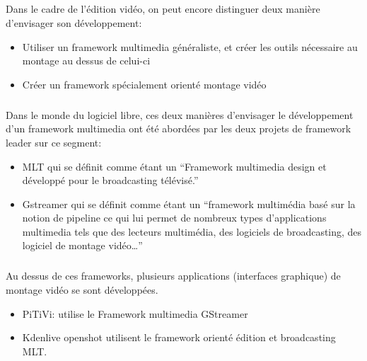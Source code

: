 \subparagraph{}

Dans le cadre de l'édition vidéo, on peut encore distinguer deux
manière d'envisager son développement:

\begin {itemize}

  \item {Utiliser un framework multimedia généraliste, et créer les
  outils nécessaire
         au montage au dessus de celui-ci} %

  \item {Créer un framework spécialement orienté montage vidéo}

\end {itemize}

\subparagraph{}

Dans le monde du logiciel libre, ces deux manières d'envisager le
développement d'un framework multimedia ont été abordées par les
deux projets de framework leader sur ce segment:

\begin {itemize}

  \item {MLT qui se définit comme étant un ``Framework multimedia design
    et développé pour le broadcasting télévisé.''}

  \item {Gstreamer qui se définit comme étant un ``framework multimédia
    basé sur la notion de pipeline ce qui lui permet de nombreux types
    d'applications multimedia tels que des lecteurs multimédia, des
    logiciels de broadcasting, des logiciel de montage vidéo\ldots''}

\end {itemize}

\subparagraph {}

Au dessus de ces frameworks, plusieurs applications (interfaces graphique)
de montage vidéo se sont développées.

\begin {itemize}

  \item {PiTiVi: utilise le Framework multimedia GStreamer}

  \item {Kdenlive openshot utilisent le framework
  orienté édition et broadcasting MLT.}

\end {itemize}

